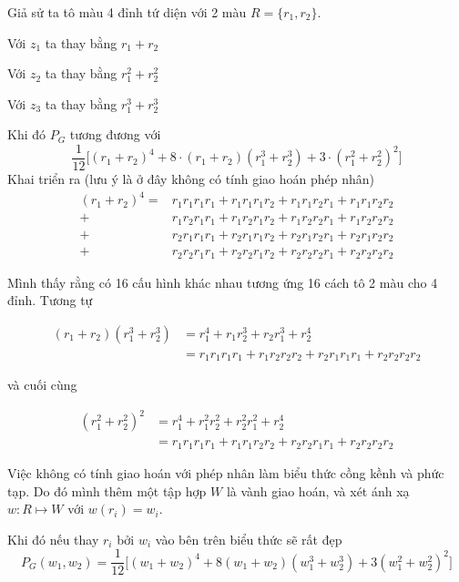 \begin{example}
    Giả sử ta tô màu 4 đỉnh tứ diện với 2 màu $R = \{r_1, r_2\}$.

    Với $z_1$ ta thay bằng $r_1 + r_2$

    Với $z_2$ ta thay bằng $r_1^2 + r_2^2$

    Với $z_3$ ta thay bằng $r_1^3 + r_2^3$

    Khi đó $P_G$ tương đương với
    \[\frac{1}{12}\big[(r_1 + r_2)^4 + 8 \cdot (r_1 + r_2)(r_1^3 + r_2^3) + 3 \cdot (r_1^2 + r_2^2)^2\big]\]
    Khai triển ra (lưu ý là ở đây không có tính giao hoán phép nhân)
    \begin{align*}
        (r_1 + r_2)^4 = & r_1 r_1 r_1 r_1 + r_1 r_1 r_1 r_2 + r_1 r_1 r_2 r_1 + r_1 r_1 r_2 r_2 \\
        + & r_1 r_2 r_1 r_1 + r_1 r_2 r_1 r_2 + r_1 r_2 r_2 r_1 + r_1 r_2 r_2 r_2 \\
        + & r_2 r_1 r_1 r_1 + r_2 r_1 r_1 r_2 + r_2 r_1 r_2 r_1 + r_2 r_1 r_2 r_2 \\
        + & r_2 r_2 r_1 r_1 + r_2 r_2 r_1 r_2 + r_2 r_2 r_2 r_1 + r_2 r_2 r_2 r_2
    \end{align*}

    Mình thấy rằng có 16 cấu hình khác nhau tương ứng 16 cách tô 2 màu cho 4 đỉnh. Tương tự

    \begin{align*}
        (r_1 + r_2) (r_1^3 + r_2^3) & = r_1^4 + r_1 r_2^3 + r_2 r_1^3 + r_2^4 \\
        & = r_1 r_1 r_1 r_1 + r_1 r_2 r_2 r_2 + r_2 r_1 r_1 r_1 + r_2 r_2 r_2 r_2
    \end{align*}

    và cuối cùng

    \begin{align*}
        (r_1^2 + r_2^2)^2 & = r_1^4 + r_1^2 r_2^2 + r_2^2 r_1^2 + r_2^4 \\
        & = r_1 r_1 r_1 r_1 + r_1 r_1 r_2 r_2 + r_2 r_2 r_1 r_1 + r_2 r_2 r_2 r_2
    \end{align*}

    Việc không có tính giao hoán với phép nhân làm biểu thức cồng kềnh và phức tạp.
    Do đó mình thêm một tập hợp $W$ là vành giao hoán, và xét ánh xạ $w: R \mapsto W$ với $w(r_i) = w_i$.

    Khi đó nếu thay $r_i$ bởi $w_i$ vào bên trên biểu thức sẽ rất đẹp
    \[P_G(w_1, w_2) = \frac{1}{12} \big[(w_1 + w_2)^4 + 8 (w_1 + w_2) (w_1^3 + w_2^3) + 3 (w_1^2 + w_2^2)^2\big]\]


\end{example}
